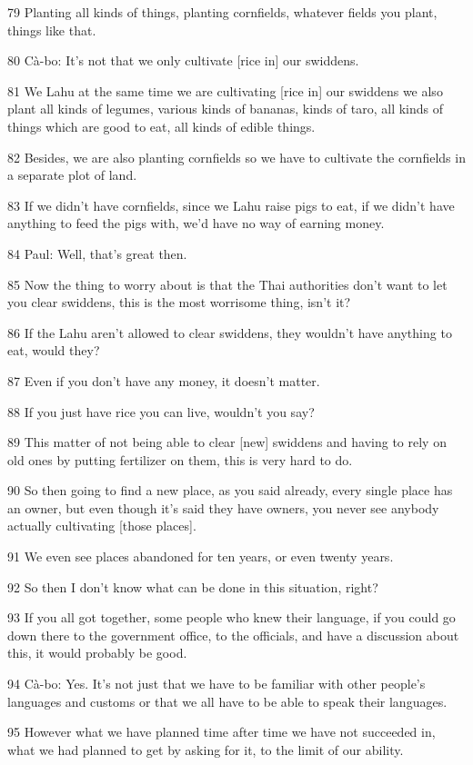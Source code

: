 79 Planting all kinds of things, planting cornfields, whatever fields you plant,
things like that.

80 Cà-bo: It's not that we only cultivate [rice in] our swiddens.

81 We Lahu at the same time we are cultivating [rice in] our swiddens we also plant
all kinds of legumes, various kinds of bananas, kinds of taro, all kinds of things
which are good to eat, all kinds of edible things.

82 Besides, we are also planting cornfields so we have to cultivate the cornfields
in a separate plot of land.

83 If we didn't have cornfields, since we Lahu raise pigs to eat, if we didn't
have anything to feed the pigs with, we'd have no way of earning money.

84 Paul: Well, that's great then.

85 Now the thing to worry about is that the Thai authorities don't want to let
you clear swiddens, this is the most worrisome thing, isn't it?

86 If the Lahu aren't allowed to clear swiddens, they wouldn't have anything to
eat, would they?

87 Even if you don't have any money, it doesn't matter.

88 If you just have rice you can live, wouldn't you say?

89 This matter of not being able to clear [new] swiddens and having to rely on
old ones by putting fertilizer on them, this is very hard to do.

90 So then going to find a new place, as you said already, every single place has
an owner, but even though it's said they have owners, you never see anybody actually
cultivating [those places].

91 We even see places abandoned for ten years, or even twenty years.

92 So then I don't know what can be done in this situation, right?

93 If you all got together, some people who knew their language, if you could go
down there to the government office, to the officials, and have a discussion about
this, it would probably be good.

94 Cà-bo: Yes. It's not just that we have to be familiar with other people's languages
and customs or that we all have to be able to speak their languages.

95 However what we have planned time after time we have not succeeded in, what
we had planned to get by asking for it, to the limit of our ability.

